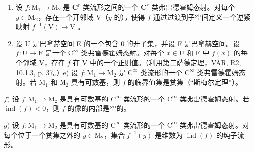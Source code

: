 \begin{enumerate}
\def\labelenumi{\alph{enumi})}
\setcounter{enumi}{2}
\item
  设 \(f \colon \mathrm{M}_1 \to \mathrm{M}_2\) 是 \(\mathbf{C}^r\) 类流形之间的一个 \(\mathbf{C}^r\) 类弗雷德霍姆态射。对每个 \(y \in \mathbf{M}_2\)，存在一个开邻域 \(\mathrm{V}\)（\(y\) 的），使得 \(f\) 通过过渡到子空间定义一个逆紧映射 \(f^{-1}(\mathrm{V}) \to \mathrm{V}\) 。
\item
  设 U 是巴拿赫空间 E 的一个包含 0 的开子集，并设 F 是巴拿赫空间。设 \(f \colon \mathrm{U} \to \mathrm{F}\) 是一个 \(\mathrm{C}^{\infty}\) 类弗雷德霍姆态射。对每个 \(x \in \mathrm{U}\) 和 F 中 \(f(x)\) 的每个邻域 V，存在 \(f\) 在 V 中的一个正则值。（利用第二萨德定理，VAR, R2, 10.1.3, p. 37。）e) 设 \(f \colon \mathrm{M}_1 \to \mathrm{M}_2\) 是 \(\mathrm{C}^{\infty}\) 类流形的一个 \(\mathrm{C}^{\infty}\) 类弗雷德霍姆态射。若 \(\mathrm{M}_1\) 和 \(\mathrm{M}_2\) 具有可数基，则 \(f\) 的临界值集是贫集（“斯梅尔定理”）。
\end{enumerate}

\(f)\) 设 \(f\colon \mathrm{M}_1\to \mathrm{M}_2\) 是具有可数基的 \(\mathrm{C}^{\infty}\) 类流形的一个 \(\mathrm{C}^{\infty}\) 类弗雷德霍姆态射。若 \(\operatorname {ind}(f) < 0\)，则 \(f\) 的像的内部是空的。

\(g)\) 设 \(f\colon \mathrm{M}_1\to \mathrm{M}_2\) 是具有可数基的 \(\mathrm{C}^{\infty}\) 类流形的一个 \(\mathrm{C}^{\infty}\) 类弗雷德霍姆态射。对每个位于一个贫集之外的 \(y\in \mathrm{M}_2\)，集合 \(f^{-1}(y)\) 是维数为 \(\operatorname {ind}(f)\) 的纯子流形。